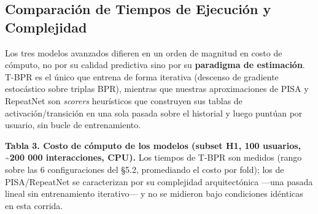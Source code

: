 \documentclass{article}
\begin{document}
\subsection{Comparación de Tiempos de Ejecución y Complejidad}\label{comparaciuxf3n-de-tiempos-de-ejecuciuxf3n-y-complejidad}

Los tres modelos avanzados difieren en un orden de magnitud en costo de cómputo, no por su calidad predictiva sino por su \textbf{paradigma de estimación}. T-BPR es el único que entrena de forma iterativa (descenso de gradiente estocástico sobre triplas BPR), mientras que nuestras aproximaciones de PISA y RepeatNet son \emph{scorers} heurísticos que construyen sus tablas de activación/transición en una sola pasada sobre el historial y luego puntúan por usuario, sin bucle de entrenamiento.

\textbf{Tabla 3. Costo de cómputo de los modelos (subset H1, 100 usuarios, \textasciitilde200 000 interacciones, CPU).} Los tiempos de T-BPR son medidos (rango sobre las 6 configuraciones del §5.2, promediando el costo por fold); los de PISA/RepeatNet se caracterizan por su complejidad arquitectónica ---una pasada lineal sin entrenamiento iterativo--- y no se midieron bajo condiciones idénticas en esta corrida.
\end{document}

